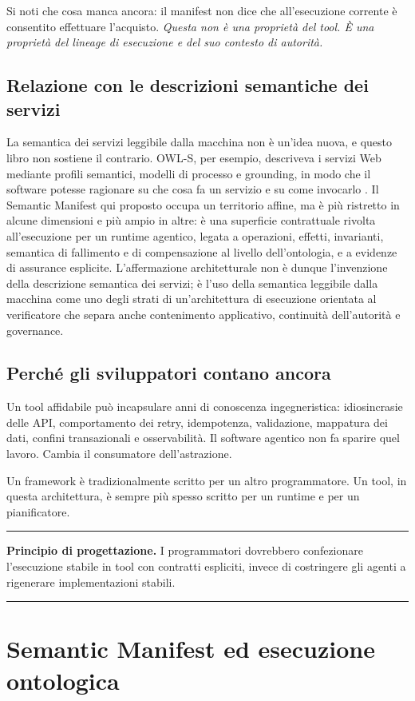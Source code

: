 \documentclass[10pt,oneside,openany]{book}
\newcommand{\principle}[1]{%
  \vspace{4pt}
  \noindent\begin{minipage}{\linewidth}
  \hrule\vspace{5pt}
  \small\sffamily\raggedright\textbf{Principio di progettazione.} #1
  \vspace{5pt}\hrule
  \end{minipage}\vspace{4pt}
}
\begin{document}
Si noti che cosa manca ancora: il manifest non dice che all'esecuzione corrente è consentito effettuare l'acquisto. \emph{Questa non è una proprietà del tool. È una proprietà del lineage di esecuzione e del suo contesto di autorità.}

\section{Relazione con le descrizioni semantiche dei servizi}
La semantica dei servizi leggibile dalla macchina non è un'idea nuova, e questo libro non sostiene il contrario. OWL-S, per esempio, descriveva i servizi Web mediante profili semantici, modelli di processo e grounding, in modo che il software potesse ragionare su che cosa fa un servizio e su come invocarlo \cite{owls2004}. Il Semantic Manifest qui proposto occupa un territorio affine, ma è più ristretto in alcune dimensioni e più ampio in altre: è una superficie contrattuale rivolta all'esecuzione per un runtime agentico, legata a operazioni, effetti, invarianti, semantica di fallimento e di compensazione al livello dell'ontologia, e a evidenze di assurance esplicite. L'affermazione architetturale non è dunque l'invenzione della descrizione semantica dei servizi; è l'uso della semantica leggibile dalla macchina come uno degli strati di un'architettura di esecuzione orientata al verificatore che separa anche contenimento applicativo, continuità dell'autorità e governance.

\section{Perché gli sviluppatori contano ancora}
Un tool affidabile può incapsulare anni di conoscenza ingegneristica: idiosincrasie delle API, comportamento dei retry, idempotenza, validazione, mappatura dei dati, confini transazionali e osservabilità. Il software agentico non fa sparire quel lavoro. Cambia il consumatore dell'astrazione.

Un framework è tradizionalmente scritto per un altro programmatore. Un tool, in questa architettura, è sempre più spesso scritto per un runtime e per un pianificatore.

\principle{I programmatori dovrebbero confezionare l'esecuzione stabile in tool con contratti espliciti, invece di costringere gli agenti a rigenerare implementazioni stabili.}

\chapter{Semantic Manifest ed esecuzione ontologica}
\end{document}
